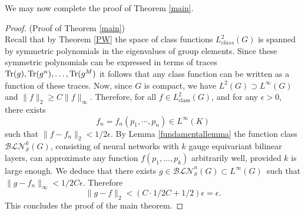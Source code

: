     We may now complete the proof of Theorem \ref{main}.
    \begin{proof}(Proof of Theorem \ref{main})\ \\
        Recall that by Theorem \ref{PW} the space of class functions $L^2_{class}(G)$ is spanned by symmetric polynomials in the eigenvalues of group elements. Since these symmetric polynomials can be expressed in terms of traces $\text{Tr}(g), \text{Tr}(g^n), \dots, \text{Tr}(g^M)$ it follows that any class function can be written as a function of these traces. Now, since $G$ is compact, we have $L^2(G)\supset L^\infty(G)$ and  $\|f\|_2\geq C\|f\|_\infty$.
        Therefore, for all $f\in L^2_\text{class}(G)$, and for any $\epsilon>0$, there exists $$ f_n=f_n(p_1,\cdots,p_n)\in L^\infty(K)$$ such that $\|f-f_n\|_2<1/2\epsilon$. By Lemma \ref{fundamentallemma} the function class $\mathcal{BLN}^k_{\hat{\sigma}}(G)$, consisting of neural networks with $k$ gauge equivariant bilinear layers, can approximate any function $f(p_1, \dots, p_k)$ arbitrarily well, provided $k$ is large enough. We deduce that there exists $g\in \mathcal{BLN}^n_{\hat{\sigma}}(G)\subset L^\infty(G)$\ such that $\|g-f_n\|_\infty<1/2C \epsilon$. Therefore $$\|g-f\|_2<(C\cdot 1/2C + 1/2)\epsilon=\epsilon.$$ This concludes the proof of the main theorem.
    \end{proof}

    